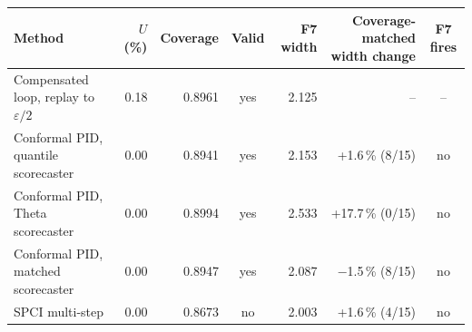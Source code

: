 \begin{tabular}{@{}lrrcrrc@{}}
\toprule
Method & $U$ (\%) & Coverage & Valid & F7 width & Coverage-matched width change & F7 fires \\
\midrule
Compensated loop, replay to $\varepsilon/2$ & 0.18 & 0.8961 & yes & 2.125 & -- & -- \\
Conformal PID, quantile scorecaster & 0.00 & 0.8941 & yes & 2.153 & +1.6\,\% (8/15) & no \\
Conformal PID, Theta scorecaster & 0.00 & 0.8994 & yes & 2.533 & +17.7\,\% (0/15) & no \\
Conformal PID, matched scorecaster & 0.00 & 0.8947 & yes & 2.087 & $-$1.5\,\% (8/15) & no \\
SPCI multi-step & 0.00 & 0.8673 & no & 2.003 & +1.6\,\% (4/15) & no \\
\bottomrule
\end{tabular}
